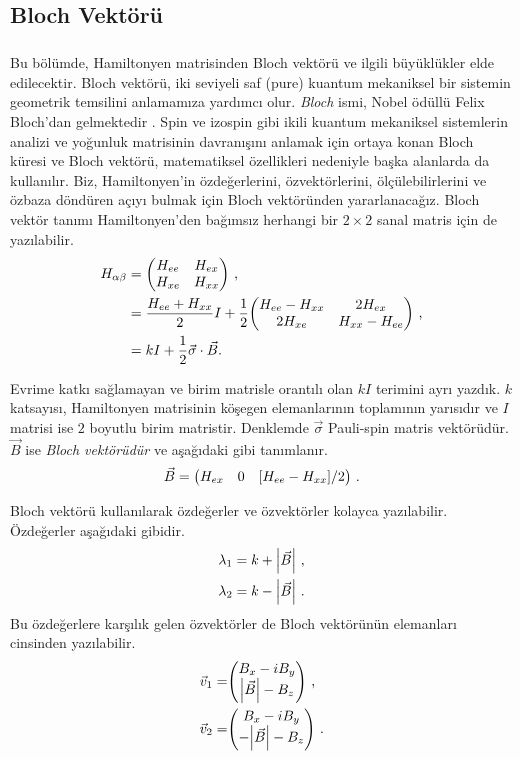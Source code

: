 \begin{appendices}
\chapter{Bloch Vektörü}
\paragraph{}
Bu bölümde, Hamiltonyen matrisinden Bloch vektörü ve ilgili büyüklükler elde edilecektir. Bloch vektörü, iki seviyeli saf (pure) kuantum mekaniksel bir sistemin geometrik temsilini anlamamıza yardımcı olur. \emph{Bloch} ismi, Nobel ödüllü Felix Bloch'dan gelmektedir \cite{Bloch:1946zza}. Spin ve izospin gibi ikili kuantum mekaniksel sistemlerin analizi ve yoğunluk matrisinin davranışını anlamak için ortaya konan Bloch küresi ve Bloch vektörü, matematiksel özellikleri nedeniyle başka alanlarda da kullanılır. Biz, Hamiltonyen'in özdeğerlerini, özvektörlerini, ölçülebilirlerini ve özbaza döndüren açıyı bulmak için Bloch vektöründen yararlanacağız. Bloch vektör tanımı Hamiltonyen'den bağımsız herhangi bir $ 2 \times 2 $ sanal matris için de yazılabilir.
\begin{align}
\nonumber H_{\alpha\beta} &= \mqty(H_{ee} & H_{ex} \\ H_{xe} & H_{xx}) \text{ ,}\\
\nonumber				   &= \frac{H_{ee} + H_{xx}}{2} I + \frac{1}{2} \mqty(H_{ee} - H_{xx} & 2 H_{ex}\\ 2 H_{xe} & H_{xx}-H_{ee})  \text{ ,}\\
						   &= k I + \frac{1}{2} \vec{\sigma} \cdot \vec{B} \text{.}
\end{align}

Evrime katkı sağlamayan ve birim matrisle orantılı olan $ kI $ terimini ayrı yazdık. $ k $ katsayısı, Hamiltonyen matrisinin köşegen elemanlarının toplamının yarısıdır ve $ I $ matrisi ise $2$ boyutlu birim matristir. Denklemde $ \vec{\sigma} $ Pauli-spin matris vektörüdür. $ \vec{B} $ ise \emph{Bloch vektörüdür} ve aşağıdaki gibi tanımlanır.
\begin{equation}\label{eqn:appBloch_B_Hmat}
    \vec{B} = \mqty(H_{ex} & 0 & [H_{ee}-H_{xx}]/2 ) \text{ .}
\end{equation}

Bloch vektörü kullanılarak özdeğerler ve özvektörler kolayca yazılabilir. Özdeğerler aşağıdaki gibidir.
\begin{align} \label{eqn:appBloch_B_Ozdeg}
    \lambda_{1} = k + \abs{\vec{B}} \text{ ,}\\
    \lambda_{2} = k - \abs{\vec{B}} \text{ .}
\end{align}
Bu özdeğerlere karşılık gelen özvektörler de Bloch vektörünün elemanları cinsinden yazılabilir.
\begin{align}
    \vec{v}_{1} =& \mqty(B_{x} - iB_{y} \\ \abs{\vec{B}} - B_{z}) \text{ ,}\\
    \vec{v}_{2} =& \mqty(B_{x} - iB_{y} \\ -\abs{\vec{B}} - B_{z}) \text{ .}
\end{align}


\end{appendices}
